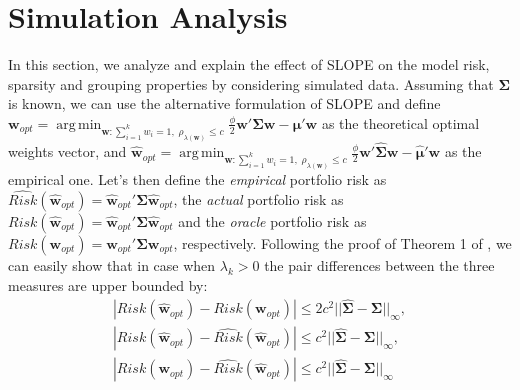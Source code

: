 \documentclass[12pt, a4paper]{article}
\newcommand{\bfw}{\boldsymbol{w} }
\newcommand{\bfmu}{\boldsymbol{\mu} }
\newcommand{\bfSigma}{\boldsymbol{\Sigma} }
\DeclareMathOperator*{\argmin}{arg\,min}
\begin{document}
\section{Simulation Analysis}%
In this section, we analyze and explain the effect of SLOPE on the model risk, sparsity and grouping properties by considering simulated data.
Assuming that  $\bfSigma$ is known, we can use the alternative formulation of SLOPE and define 
$\bfw_{opt} = \displaystyle \argmin_{\bfw: \sum_{i=1}^k w_i=1,\; \rho_{\lambda(\bfw)}\leq c}  \frac{\phi}{2} \bfw'\bfSigma \bfw - \bfmu'\bfw$ as the theoretical optimal weights vector, and $\hat{\bfw}_{opt} = \displaystyle \argmin_{\bfw: \sum_{i=1}^k w_i=1,\; \rho_{\lambda(\bfw)}\leq c}   \frac{\phi}{2} \bfw'\hat{\bfSigma} \bfw - \hat{\bfmu}'\bfw$
as the empirical one. Let's then define the \textit{empirical} portfolio risk as $\widehat{Risk}(\hat{\bfw}_{opt}) = \hat{\bfw}_ {opt}' \hat{\bfSigma} \hat{\bfw}_{opt}$, the \textit{actual} portfolio risk as $Risk(\hat{\bfw}_{opt}) = \hat{\bfw}_{opt}' \bfSigma \hat{\bfw}_{opt}$ and the \textit{oracle} portfolio risk as $Risk(\bfw_{opt}) = \bfw_{opt}' \bfSigma \bfw_{opt}$, respectively. Following the proof of Theorem 1 of \cite{Fan2012}, we can easily show that in case when $\lambda_k>0$
the pair differences between the three measures are upper bounded by:
\begin{gather}
|Risk(\hat{\bfw}_{opt})  - Risk(\bfw_{opt})| \leq 2 c^2 ||\widehat{\bfSigma} - \bfSigma||_{\infty},  \\
|Risk(\hat{\bfw}_{opt})  - \widehat{Risk}(\hat{\bfw}_{opt})| \leq c^2 ||\widehat{\bfSigma} - \bfSigma||_{\infty}, \\
|Risk(\bfw_{opt})  - \widehat{Risk}(\hat{\bfw}_{opt})|  \leq c^2 ||\widehat{\bfSigma} - \bfSigma||_{\infty}
\end{gather}
\end{document}
